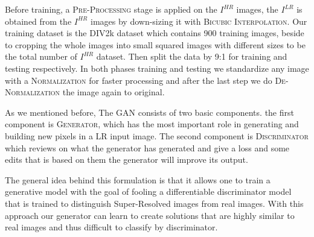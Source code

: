 \documentclass[12pt]{article}
\begin{document}
			Before training, a \textsc{Pre-Processing} stage is applied on the $I^{HR}$ images, the $I^{LR}$ is obtained from the $I^{HR}$ images by down-sizing it with \textsc{Bicubic Interpolation}. Our training dataset is the DIV2k dataset \cite{29} which contains 900 training images, beside to cropping the whole images into small squared images with different sizes to be the total number of $I^{HR}$ dataset. Then split the data by 9:1 for training and testing respectively. In both phases training and testing we standardize any image with a \textsc{Normalization} for faster processing and after the last step we do \textsc{De-Normalization} the image again to original.
			
			As we mentioned before, The GAN consists of two basic components. the first component is \textsc{Generator}, which has the most important role in generating and building new pixels in a LR input image. The second component is \textsc{Discriminator} which reviews on what the generator has generated and give a loss and some edits that is based on them the generator will improve its output.
			
			The general idea behind this formulation is that it allows one to train a generative model with the goal of fooling a differentiable discriminator model that is trained to distinguish Super-Resolved images from real images. With this approach our generator can learn to create solutions that are highly similar to real images and thus difficult to classify by discriminator.
			
\end{document}
